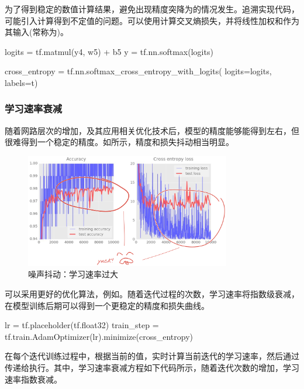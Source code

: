 \begin{content}
为了得到稳定的数值计算结果，避免出现精度突降为的情况发生。追溯实现代码，可能引入计算得到不定值的问题。可以使用计算交叉熵损失，并将线性加权和作为其输入(常称为)。

\begin{leftbar}
\begin{python}
logits = tf.matmul(y4, w5) + b5
y = tf.nn.softmax(logits)

cross_entropy = tf.nn.softmax_cross_entropy_with_logits(
  logits=logits, labels=t)
\end{python}
\end{leftbar}

\subsubsection{学习速率衰减}

随着网路层次的增加，及其应用相关优化技术后，模型的精度能够能得到左右，但很难得到一个稳定的精度。如所示，精度和损失抖动相当明显。

\begin{figure}[H]
\centering
\includegraphics[width=0.8\textwidth]{figures/mnist-lr-too-larger.png}
\caption{噪声抖动：学习速率过大}
 \label{fig:mnist-lr-too-larger}
\end{figure}

可以采用更好的优化算法，例如。随着迭代过程的次数，学习速率将指数级衰减，在模型训练后期可以得到一个更稳定的精度和损失曲线。

\begin{leftbar}
\begin{python}
lr = tf.placeholder(tf.float32)
train_step = tf.train.AdamOptimizer(lr).minimize(cross_entropy)
\end{python}
\end{leftbar}

在每个迭代训练过程中，根据当前的值，实时计算当前迭代的学习速率，然后通过传递给执行。其中，学习速率衰减方程如下代码所示，随着迭代次数的增加，学习速率指数衰减。


\end{content}
